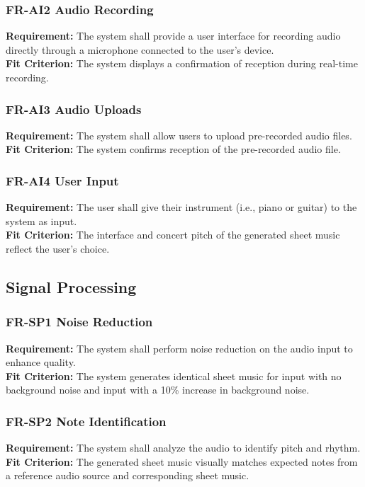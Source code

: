 \documentclass[12pt]{article}
\begin{document}
\subsubsection*{FR-AI2 Audio Recording} \label{FR-AI2}
\textbf{Requirement:} The system shall provide a user interface for recording audio directly through a microphone connected to the user's device. \\
\textbf{Fit Criterion:} The system displays a confirmation of reception during real-time recording.
\subsubsection*{FR-AI3 Audio Uploads} \label{FR-AI3}
\textbf{Requirement:} The system shall allow users to upload pre-recorded audio files. \\
\textbf{Fit Criterion:} The system confirms reception of the pre-recorded audio file.
\subsubsection*{FR-AI4 User Input} \label{FR-AI4}
\textbf{Requirement:} The user shall give their instrument (i.e., piano or guitar) to the system as input. \\
\textbf{Fit Criterion:} The interface and concert pitch of the generated sheet music reflect the user's choice.

\subsection{Signal Processing}
\subsubsection*{FR-SP1 Noise Reduction} \label{FR-SP1}
\textbf{Requirement:} The system shall perform noise reduction on the audio input to enhance quality. \\
\textbf{Fit Criterion:} The system generates identical sheet music for input with no background noise and input with a 10\% increase in background noise.
\subsubsection*{FR-SP2 Note Identification} \label{FR-SP2}
\textbf{Requirement:} The system shall analyze the audio to identify pitch and rhythm. \\
\textbf{Fit Criterion:} The generated sheet music visually matches expected notes from a reference audio source and corresponding sheet music.
\end{document}
